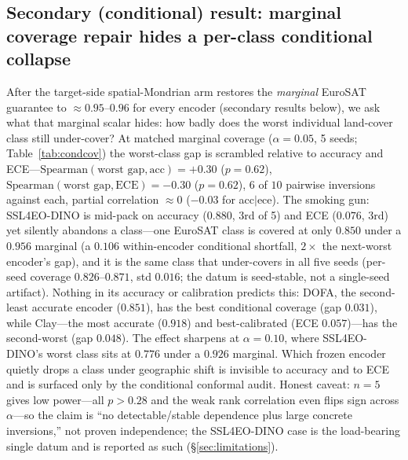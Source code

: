 \documentclass[11pt]{article}
\begin{document}
\subsection*{Secondary (conditional) result: marginal coverage repair hides a per-class conditional collapse}
After the target-side spatial-Mondrian arm restores the \emph{marginal} EuroSAT guarantee to
$\approx0.95$--$0.96$ for every encoder (secondary results below), we ask what that marginal scalar hides:
how badly does the worst individual land-cover class still under-cover? At matched marginal coverage
($\alpha{=}0.05$, 5 seeds; Table~\ref{tab:condcov}) the worst-class gap is scrambled relative to
accuracy and ECE---$\mathrm{Spearman}(\text{worst gap},\text{acc})=+0.30$ ($p{=}0.62$),
$\mathrm{Spearman}(\text{worst gap},\text{ECE})=-0.30$ ($p{=}0.62$), $6$ of $10$ pairwise inversions
against each, partial correlation $\approx0$ ($-0.03$ for acc$\mid$ece). The smoking gun: SSL4EO-DINO is
mid-pack on accuracy ($0.880$, 3rd of 5) and ECE ($0.076$, 3rd) yet silently abandons a class---one
EuroSAT class is covered at only $0.850$ under a $0.956$ marginal (a $0.106$ within-encoder conditional
shortfall, $2\times$ the next-worst encoder's gap), and it is the same class that under-covers in all
five seeds (per-seed coverage $0.826$--$0.871$, std $0.016$; the datum is seed-stable, not a single-seed
artifact). Nothing in its accuracy or calibration predicts this:
DOFA, the second-least accurate encoder ($0.851$), has the best conditional coverage (gap
$0.031$), while Clay---the most accurate ($0.918$) and best-calibrated (ECE $0.057$)---has the
second-worst (gap $0.048$). The effect sharpens at $\alpha{=}0.10$, where SSL4EO-DINO's worst class
sits at $0.776$ under a $0.926$ marginal. Which frozen encoder quietly drops a class under geographic shift
is invisible to accuracy and to ECE and is surfaced only by the conditional conformal audit. Honest
caveat: $n{=}5$ gives low power---all $p>0.28$ and the weak rank correlation even flips sign across
$\alpha$---so the claim is ``no detectable/stable dependence plus large concrete inversions,'' not proven
independence; the SSL4EO-DINO case is the load-bearing single datum and is reported as such
(\S\ref{sec:limitations}).
\end{document}
